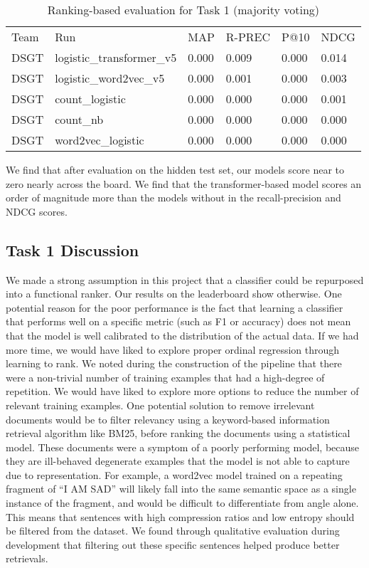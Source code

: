 \documentclass[]{style/ceurart}
\begin{document}
\begin{table}[]
\caption{Ranking-based evaluation for Task 1 (majority voting)}
\begin{tabular}{llllll}
Team & Run                       & MAP   & R-PREC & P@10 & NDCG  \\
DSGT & logistic\_transformer\_v5 & 0.000 & 0.009  & 0.000                             & 0.014 \\
DSGT & logistic\_word2vec\_v5    & 0.000 & 0.001  & 0.000                             & 0.003 \\
DSGT & count\_logistic           & 0.000 & 0.000  & 0.000                             & 0.001 \\
DSGT & count\_nb                 & 0.000 & 0.000  & 0.000                             & 0.000 \\
DSGT & word2vec\_logistic        & 0.000 & 0.000  & 0.000                             & 0.000
\end{tabular}
\end{table}



We find that after evaluation on the hidden test set, our models score near to zero nearly across the board. We find that the transformer-based model scores an order of magnitude more than the models without in the recall-precision and NDCG scores. 

\subsection{Task 1 Discussion}

We made a strong assumption in this project that a classifier could be repurposed into a functional ranker. Our results on the leaderboard show otherwise. One potential reason for the poor performance is the fact that learning a classifier that performs well on a specific metric (such as F1 or accuracy) does not mean that the model is well calibrated to the distribution of the actual data. If we had more time, we would have liked to explore proper ordinal regression through learning to rank.
We noted during the construction of the pipeline that there were a non-trivial number of training examples that had a high-degree of repetition. We would have liked to explore more options to reduce the number of relevant training examples. One potential solution to remove irrelevant documents would be to filter relevancy using a keyword-based information retrieval algorithm like BM25, before ranking the documents using a statistical model. These documents were a symptom of a poorly performing model, because they are ill-behaved degenerate examples that the model is not able to capture due to representation. For example, a word2vec model trained on a repeating fragment of “I AM SAD” will likely fall into the same semantic space as a single instance of the fragment, and would be difficult to differentiate from angle alone. This means that sentences with high compression ratios and low entropy should be filtered from the dataset. We found through qualitative evaluation during development that filtering out these specific sentences helped produce better retrievals.	
\end{document}

